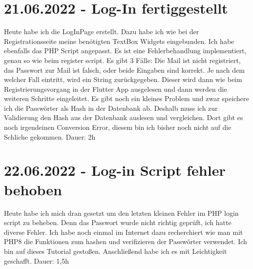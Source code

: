 \documentclass[letterpaper,10pt]{article}
\begin{document}
\section{21.06.2022 - Log-In fertiggestellt}
Heute habe ich die LogInPage erstellt. Dazu habe ich wie bei der Registrationsseite meine benötigten TextBox Widgets eingebunden. Ich habe ebenfalls das PHP Script angepasst. Es ist eine Fehlerbehandlung implementiert, genau so wie beim register script. Es gibt 3 Fälle: Die Mail ist nicht registriert, das Passwort zur Mail ist falsch, oder beide Eingaben sind korrekt. Je nach dem welcher Fall eintritt, wird ein String zurückgegeben. Dieser wird dann wie beim Registrierungsvorgang in der Flutter App ausgelesen und dann werden die weiteren Schritte eingeleitet. Es gibt noch ein kleines Problem und zwar speichere ich die Passwörter als Hash in der Datenbank ab. Deshalb muss ich zur Validierung den Hash aus der Datenbank auslesen und vergleichen. Dort gibt es noch irgendeinen Conversion Error, diesem bin ich bisher noch nicht auf die Schliche gekommen. Dauer: 2h
\section{22.06.2022 - Log-in Script fehler behoben}
Heute habe ich mich dran gesetzt um den letzten kleinen Fehler im PHP login script zu beheben. Denn das Passwort wurde nicht richtig geprüft, ich hatte diverse Fehler. Ich habe noch einmal im Internet dazu recherchiert wie man mit PHP8 die Funktionen zum hashen und verifizieren der Passwörter verwendet. Ich bin auf dieses Tutorial \cite{php8-login-mysql} gestoßen. Anschließend habe ich es mit Leichtigkeit geschafft. Dauer: 1,5h
\printbibliography
\end{document}

